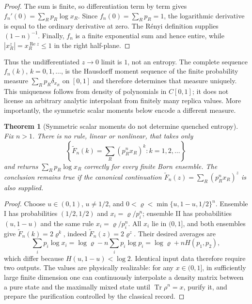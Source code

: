 \documentclass[aps,prx,reprint,superscriptaddress,nobibnotes,longbibliography]{revtex4-2}
\newtheorem{theorem}{Theorem}
\theoremstyle{remark}
\newcommand{\Tr}{\operatorname{Tr}}
\begin{document}
\begin{proof}
The sum is finite, so differentiation term by term gives
$f_n'(0)=\sum_Rp_R\log x_R$.  Since $f_n(0)=\sum_Rp_R=1$, the logarithmic derivative is equal to the ordinary derivative at zero.  The R\'enyi definition supplies $(1-n)^{-1}$.  Finally, $f_n$ is a finite exponential sum and hence entire, while $|x_R^z|=x_R^{\operatorname{Re}z}\le1$ in the right half-plane.
\end{proof}

Thus the undifferentiated $z\to0$ limit is $1$, not an entropy.  The complete sequence $f_n(k)$, $k=0,1,\ldots$, is the Hausdorff moment sequence of the finite probability measure $\sum_Rp_R\delta_{x_R}$ on $[0,1]$ and therefore determines that measure uniquely.  This uniqueness follows from density of polynomials in $C[0,1]$; it does not license an arbitrary analytic interpolant from finitely many replica values.  More importantly, the symmetric scalar moments below encode a different measure.

\begin{theorem}[Symmetric scalar moments do not determine quenched entropy]
\label{thm:no-go}
Fix $n>1$.  There is no rule, linear or nonlinear, that takes only
\begin{equation}
 \left\{\widetilde F_n(k)=\sum_R(p_R^nx_R)^k:k=1,2,\ldots\right\}
 \label{eq:symmdata}
\end{equation}
and returns $\sum_Rp_R\log x_R$ correctly for every finite Born ensemble.  The conclusion remains true if the canonical continuation
$\widetilde F_n(z)=\sum_R(p_R^nx_R)^z$ is also supplied.
\end{theorem}

\begin{proof}
Choose $u\in(0,1)$, $u\ne1/2$, and
$0<\varrho<\min\{u,1-u,1/2\}^n$.  Ensemble I has probabilities $(1/2,1/2)$ and $x_i=\varrho/p_i^n$; ensemble II has probabilities $(u,1-u)$ and the same rule $x_i=\varrho/p_i^n$.  All $x_i$ lie in $(0,1]$, and both ensembles give
$\widetilde F_n(k)=2\varrho^k$, indeed $\widetilde F_n(z)=2\varrho^z$.  Their desired averages are
\begin{equation}
 \sum_i p_i\log x_i=\log\varrho-n\sum_i p_i\log p_i
 =\log\varrho+nH(p_1,p_2),
\end{equation}
which differ because $H(u,1-u)<\log2$.  Identical input data therefore require two outputs.  The values are physically realizable: for any $x\in(0,1]$, in sufficiently large finite dimension one can continuously interpolate a density matrix between a pure state and the maximally mixed state until $\Tr\rho^n=x$, purify it, and prepare the purification controlled by the classical record.
\end{proof}
\end{document}
